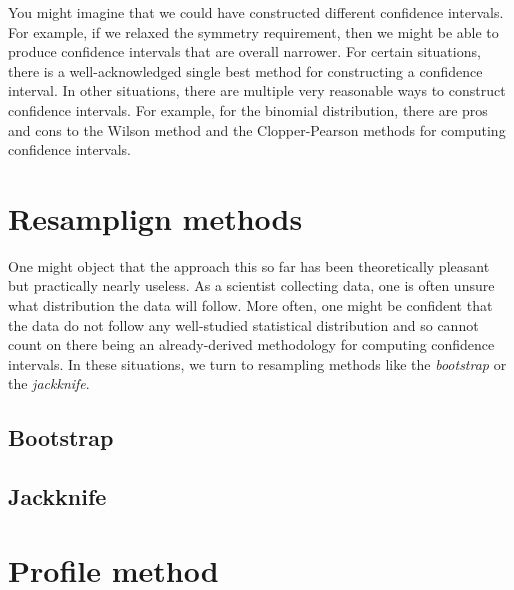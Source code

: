 You might imagine that we could have constructed different confidence intervals. For example,
if we relaxed the symmetry requirement, then we might be able to produce confidence intervals
that are overall narrower. For certain situations, there is a well-acknowledged single best
method for constructing a confidence interval. In other situations, there are multiple very
reasonable ways to construct confidence intervals. For example, for the binomial distribution,
there are pros and cons to the Wilson method and the Clopper-Pearson methods for computing
confidence intervals.

\section{Resamplign methods}

One might object that the approach this so far has been theoretically pleasant
but practically nearly useless. As a scientist collecting data, one is often
unsure what distribution the data will follow. More often, one might be
confident that the data do not follow any well-studied statistical distribution
and so cannot count on there being an already-derived methodology for computing
confidence intervals. In these situations, we turn to resampling methods like the
\emph{bootstrap} or the \emph{jackknife}.

\subsection{Bootstrap}



\subsection{Jackknife}

\section{Profile method}
